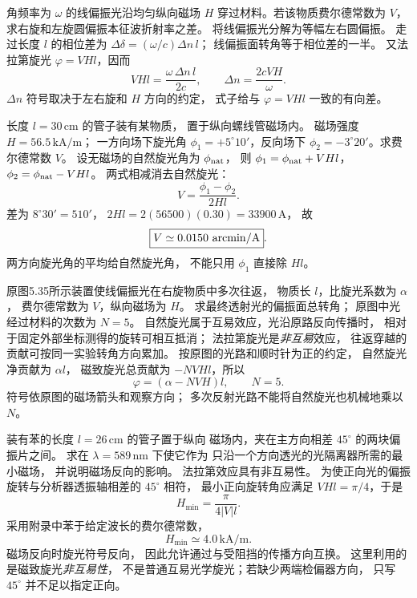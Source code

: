 角频率为 $\omega$ 的线偏振光沿均匀纵向磁场
$H$ 穿过材料。若该物质费尔德常数为 $V$，
求右旋和左旋圆偏振本征波折射率之差。
\exsolution
将线偏振光分解为等幅左右圆偏振。
走过长度 $l$ 的相位差为
$\Delta\delta=(\omega/c)\Delta n\,l$；
线偏振面转角等于相位差的一半。
又法拉第旋光 $\varphi=VHl$，因而
\[
 VHl=\frac{\omega\,\Delta n\,l}{2c},
 \qquad
 \boxed{\Delta n=\frac{2cVH}{\omega}}.
\]
\excheck $\Delta n$ 符号取决于左右旋和 $H$ 方向的约定，
式子给与 $\varphi=VHl$ 一致的有向差。

长度 $l=30\,\mathrm{cm}$ 的管子装有某物质，
置于纵向螺线管磁场内。
磁场强度 $H=56.5\,\mathrm{kA/m}$；
一方向场下旋光角
$\phi_1=+5^\circ10'$，反向场下
$\phi_2=-3^\circ20'$。求费尔德常数 $V$。
\exsolution
设无磁场的自然旋光角为 $\phi_{\rm nat}$，
则
$\phi_1=\phi_{\rm nat}+VHl$，
$\phi_2=\phi_{\rm nat}-VHl$。
两式相减消去自然旋光：
\[
 \boxed{V=\frac{\phi_1-\phi_2}{2Hl}}.
\]
差为 $8^\circ30'=510'$，
$2Hl=2(56500)(0.30)=33900\,\mathrm A$，
故
\[
 \boxed{V\simeq0.0150\ {\rm arcmin/A}}.
\]
\excheck 两方向旋光角的平均给自然旋光角，
不能只用 $\phi_1$ 直接除 $Hl$。

原图5.35所示装置使线偏振光在右旋物质中多次往返，
物质长 $l$，比旋光系数为 $\alpha$，
费尔德常数为 $V$，纵向磁场为 $H$。
求最终透射光的偏振面总转角；
原图中光经过材料的次数为 $N=5$。
\exsolution
自然旋光属于互易效应，光沿原路反向传播时，
相对于固定外部坐标测得的旋转可相互抵消；
法拉第旋光是\emph{非互易}效应，
往返穿越的贡献可按同一实验转角方向累加。
按原图的光路和顺时针为正的约定，
自然旋光净贡献为 $\alpha l$，
磁致旋光总贡献为 $-NVHl$，所以
\[
 \boxed{\varphi=(\alpha-NVH)l,\qquad N=5}.
\]
\excheck 符号依原图的磁场箭头和观察方向；
多次反射光路不能将自然旋光也机械地乘以 $N$。

装有苯的长度 $l=26\,\mathrm{cm}$ 的管子置于纵向
磁场内，夹在主方向相差 $45^\circ$ 的两块偏振片之间。
求在 $\lambda=589\,\mathrm{nm}$ 下使它作为
只沿一个方向透光的光隔离器所需的最小磁场，
并说明磁场反向的影响。
\exsolution
法拉第效应具有非互易性。
为使正向光的偏振旋转与分析器透振轴相差的
$45^\circ$ 相符，
最小正向旋转角应满足
$VHl=\pi/4$，于是
\[
 \boxed{H_{\min}=\frac{\pi}{4|V|l}}.
\]
采用附录中苯于给定波长的费尔德常数，
\[
 \boxed{H_{\min}\simeq4.0\,\mathrm{kA/m}}.
\]
磁场反向时旋光符号反向，
因此允许通过与受阻挡的传播方向互换。
\excheck 这里利用的是磁致旋光\emph{非互易性}，
不是普通互易光学旋光；若缺少两端检偏器方向，
只写 $45^\circ$ 并不足以指定正向。

